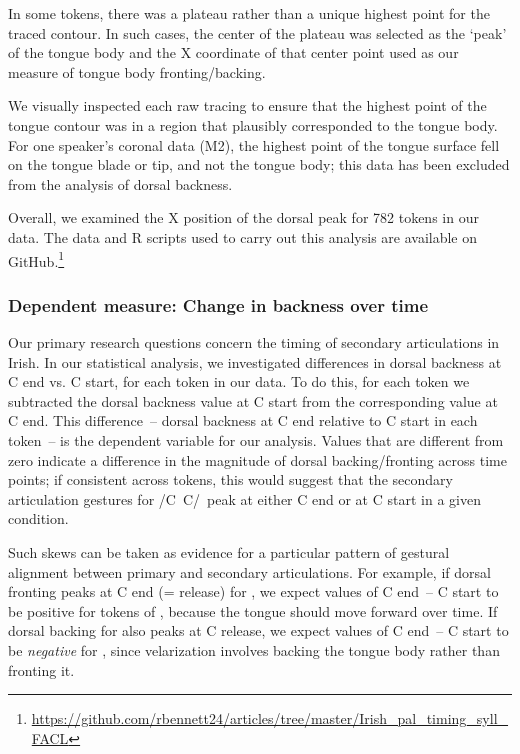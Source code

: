 \documentclass[output=paper,colorlinks,citecolor=brown]{langscibook}
\newcommand{\pal}{\ipa{ʲ}}
\newcommand{\vel}{\ipa{ˠ}}
\newcommand{\palvelcon}{/C\vel\ C\pal/}
\begin{document}
In some tokens, there was a plateau rather than a unique highest point for the traced contour. In such cases, the center of the plateau was selected as the `peak' of the tongue body and the X coordinate of that center point used as our measure of tongue body fronting/backing.

We visually inspected each raw tracing to ensure that the highest point of the tongue contour was in a region that plausibly corresponded to the tongue body. For one speaker's coronal data (M2), the highest point of the tongue surface fell on the tongue blade or tip, and not the tongue body; this data has been excluded from the analysis of dorsal backness.

Overall, we examined the X position of the dorsal peak for 782 tokens in our data. The data and R scripts used to carry out this analysis are available on GitHub.\footnote{\url{https://github.com/rbennett24/articles/tree/master/Irish_pal_timing_syll_FACL}}


\subsubsection{Dependent measure: Change in backness over time}
Our primary research questions concern the timing of secondary articulations in Irish. In our statistical analysis, we investigated differences in dorsal backness at C end vs. C start, for each token in our data. To do this, for each token we subtracted the dorsal backness value at C start from the corresponding value at C end. This difference~-- dorsal backness at C end relative to C start in each token~-- is the dependent variable for our analysis. Values that are different from zero indicate a difference in the magnitude of dorsal backing/fronting across time points; if consistent across tokens, this would suggest that the secondary articulation gestures for \palvelcon\ peak at either C end or at C start in a given condition.

Such skews can be taken as evidence for a particular pattern of gestural alignment between primary and secondary articulations. For example, if dorsal front\-ing peaks at C end (= release) for , we expect values of C end~-- C start to be positive for tokens of , because the tongue should move forward over time. If dorsal backing for  also peaks at C release, we expect values of C end~-- C start to be \textit{negative} for , since velarization involves backing the tongue body rather than fronting it.
\end{document}
